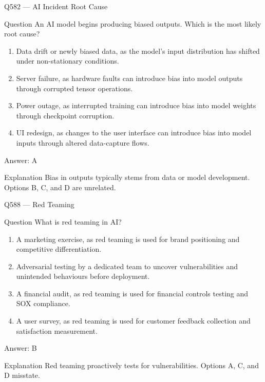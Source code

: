 \documentclass[aspectratio=169,8pt]{beamer}
\begin{document}
	
	\begin{frame}{Q582 --- AI Incident Root Cause}
		\begin{block}{Question}
			An AI model begins producing biased outputs. Which is the most likely root cause?
			\begin{enumerate}
				\item Data drift or newly biased data, as the model's input distribution has shifted under non-stationary conditions.
				\item Server failure, as hardware faults can introduce bias into model outputs through corrupted tensor operations.
				\item Power outage, as interrupted training can introduce bias into model weights through checkpoint corruption.
				\item UI redesign, as changes to the user interface can introduce bias into model inputs through altered data-capture flows.
			\end{enumerate}
		\end{block}
		\begin{exampleblock}{Answer: A}\end{exampleblock}
		\begin{block}{Explanation}
			Bias in outputs typically stems from data or model development. Options B, C, and D are unrelated.
		\end{block}
	\end{frame}

	

	

	


	
	\begin{frame}{Q588 --- Red Teaming}
		\begin{block}{Question}
			What is red teaming in AI?
			\begin{enumerate}
				\item A marketing exercise, as red teaming is used for brand positioning and competitive differentiation.
				\item Adversarial testing by a dedicated team to uncover vulnerabilities and unintended behaviours before deployment.
				\item A financial audit, as red teaming is used for financial controls testing and SOX compliance.
				\item A user survey, as red teaming is used for customer feedback collection and satisfaction measurement.
			\end{enumerate}
		\end{block}
		\begin{exampleblock}{Answer: B}\end{exampleblock}
		\begin{block}{Explanation}
			Red teaming proactively tests for vulnerabilities. Options A, C, and D misstate.
		\end{block}
	\end{frame}
\end{document}
